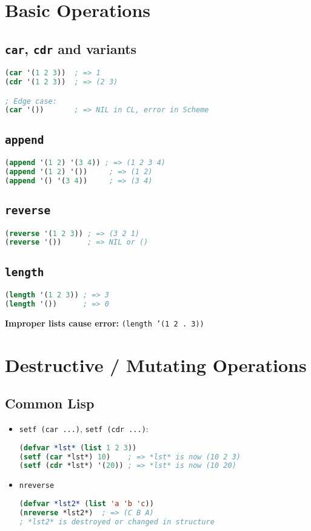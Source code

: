 \documentclass[10pt]{article}
\begin{document}
\section{Basic Operations}

\subsection*{\texttt{car}, \texttt{cdr} and variants}
\begin{lstlisting}[language=Lisp]
(car '(1 2 3))  ; => 1
(cdr '(1 2 3))  ; => (2 3)

; Edge case:
(car '())       ; => NIL in CL, error in Scheme
\end{lstlisting}

\subsection*{\texttt{append}}
\begin{lstlisting}[language=Lisp]
(append '(1 2) '(3 4)) ; => (1 2 3 4)
(append '(1 2) '())     ; => (1 2)
(append '() '(3 4))     ; => (3 4)
\end{lstlisting}

\subsection*{\texttt{reverse}}
\begin{lstlisting}[language=Lisp]
(reverse '(1 2 3)) ; => (3 2 1)
(reverse '())      ; => NIL or ()
\end{lstlisting}

\subsection*{\texttt{length}}
\begin{lstlisting}[language=Lisp]
(length '(1 2 3)) ; => 3
(length '())      ; => 0
\end{lstlisting}
\textbf{Improper lists cause error:} \texttt{(length '(1 2 . 3))}

\section{Destructive / Mutating Operations}
\subsection*{Common Lisp}
\begin{itemize}
  \item \texttt{setf (car ...)}, \texttt{setf (cdr ...)}:
\begin{lstlisting}[language=Lisp]
(defvar *lst* (list 1 2 3))
(setf (car *lst*) 10)    ; => *lst* is now (10 2 3)
(setf (cdr *lst*) '(20)) ; => *lst* is now (10 20)
\end{lstlisting}
  \item \texttt{nreverse}
\begin{lstlisting}[language=Lisp]
(defvar *lst2* (list 'a 'b 'c))
(nreverse *lst2*)  ; => (C B A)
; *lst2* is destroyed or changed in structure
\end{lstlisting}
\end{itemize}
\end{document}
